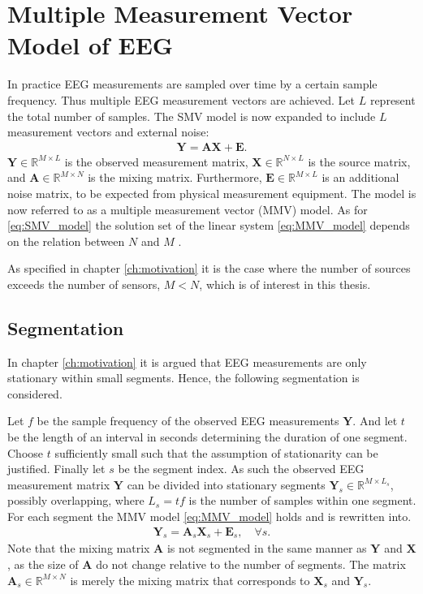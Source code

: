 \section{Multiple Measurement Vector Model of EEG}\label{sec:MMV}
In practice EEG measurements are sampled over time by a certain sample frequency. 
Thus multiple EEG measurement vectors are achieved.
Let $L$ represent the total number of samples. 
The SMV model is now expanded to include $L$ measurement vectors and external noise:
\begin{align}\label{eq:MMV_model}
\mathbf{Y} = \mathbf{AX}+\textbf{E}.
\end{align}
$\mathbf{Y} \in \mathbb{R}^{M \times L}$ is the observed measurement matrix, $\mathbf{X} \in \mathbb{R}^{N \times L}$ is the source matrix, and $\mathbf{A} \in \mathbb{R}^{M \times N}$ is the mixing matrix. 
Furthermore, $\mathbf{E} \in \mathbb{R}^{M \times L}$ is an additional noise matrix, to be expected from physical measurement equipment.  
The model is now referred to as a multiple measurement vector (MMV) model.
As for \eqref{eq:SMV_model} the solution set of the linear system \eqref{eq:MMV_model} depends on the relation between $N$ and $M$ \cite[p. 42]{CS}. 

As specified in chapter \ref{ch:motivation} it is the case where the number of sources exceeds the number of sensors, $M < N$, which is of interest in this thesis.  

\subsection{Segmentation}\label{seg_segmentation}
In chapter \ref{ch:motivation} it is argued that EEG measurements are only stationary within small segments. 
Hence, the following segmentation is considered.

Let $f$ be the sample frequency of the observed EEG measurements $\mathbf{Y}$. And let $t$ be the length of an interval in seconds determining the duration of one segment. Choose $t$ sufficiently small such that the assumption of stationarity can be justified. 
Finally let $s$ be the segment index. 
As such the observed EEG measurement matrix $\mathbf{Y}$ can be divided into stationary segments $\mathbf{Y}_s \in \mathbb{R}^{M \times L_{s}}$, possibly overlapping, where $L_s = t f$ is the number of samples within one segment.
For each segment the MMV model \eqref{eq:MMV_model} holds and is rewritten into.  
\begin{align}\label{eq:MMV_seg}
\mathbf{Y}_s = \textbf{A}_s\mathbf{X}_s + \textbf{E}_s, \quad \forall s.
\end{align}
Note that the mixing matrix $\mathbf{A}$ is not segmented in the same manner as $\mathbf{Y}$ and $\mathbf{X}$, as the size of $\mathbf{A}$ do not change relative to the number of segments. The matrix $\mathbf{A}_s\in \mathbb{R}^{M \times N}$ is merely the mixing matrix that corresponds to $\mathbf{X}_s$ and $\mathbf{Y}_s$.

